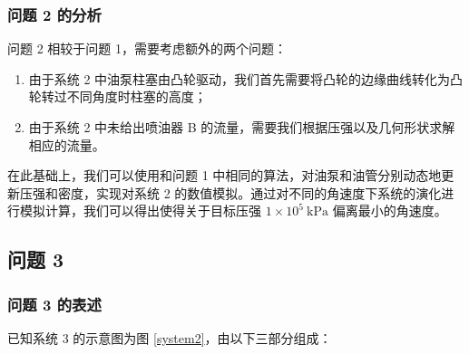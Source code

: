 \documentclass[withoutpreface,bwprint]{cumcmthesis}
\newcommand{\prb}{\times 10^5~\mathrm{kPa}}
\begin{document}
\subsubsection{问题 2 的分析}

问题 2 相较于问题 1，需要考虑额外的两个问题：

\begin{enumerate}
	\item 由于系统 2 中油泵柱塞由凸轮驱动，我们首先需要将凸轮的边缘曲线转化为凸轮转过不同角度时柱塞的高度；
	\item 由于系统 2 中未给出喷油器 B 的流量，需要我们根据压强以及几何形状求解相应的流量。
\end{enumerate}

在此基础上，我们可以使用和问题 1 中相同的算法，对油泵和油管分别动态地更新压强和密度，实现对系统 2 的数值模拟。通过对不同的角速度下系统的演化进行模拟计算，我们可以得出使得关于目标压强 $1\prb$ 偏离最小的角速度。

\subsection{问题 3}
\subsubsection{问题 3 的表述}

已知系统 3 的示意图为图 \ref{system2}，由以下三部分组成：
\end{document}
